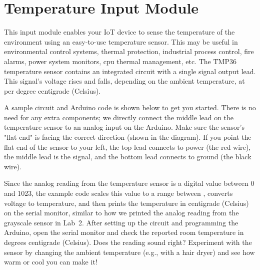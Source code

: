 
\clearpage
\section{Temperature Input Module}
\label{sec-input-temperature}

This input module enables your IoT device to sense the temperature of
the environment using an easy-to-use temperature sensor. This may be
useful in environmental control systems, thermal protection, industrial
process control, fire alarms, power system monitors, cpu thermal
management, etc. The TMP36 temperature sensor contains an integrated
circuit with a single signal output lead. This signal's voltage rises
and falls, depending on the ambient temperature, at  per
degree centigrade (Celsius).

A sample circuit and Arduino code is shown below to get you started.
There is no need for any extra components; we directly connect the
middle lead on the temperature sensor to an analog input on the Arduino.
Make sure the sensor's "flat end" is facing the correct direction (shown
in the diagram). If you point the flat end of the sensor to your left,
the top lead connects to power (the red wire), the middle lead is the
signal, and the bottom lead connects to ground (the black wire).

Since the analog reading from the temperature sensor is a digital value
between 0 and 1023, the example code scales this value to a range
between , converts voltage to temperature, and then prints
the temperature in centigrade (Celsius) on the serial monitor, similar
to how we printed the analog reading from the grayscale sensor in Lab~2.
After setting up the circuit and programming the Arduino, open the
serial monitor and check the reported room temperature in degrees
centigrade (Celsius). Does the reading sound right? Experiment with the
sensor by changing the ambient temperature (e.g., with a hair dryer)
and see how warm or cool you can make it!

